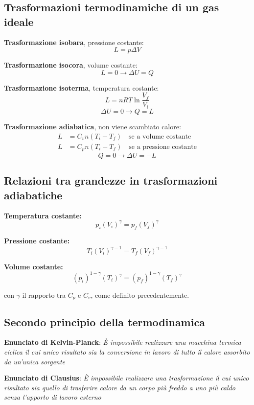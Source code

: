 \documentclass[12pt]{article}
\begin{document}
\subsection{Trasformazioni termodinamiche di un gas ideale}
\textbf{Trasformazione isobara}, pressione costante:
$$ L = p\Delta V $$

\textbf{Trasformazione isocora}, volume costante:
$$ L = 0 \longrightarrow \Delta U = Q $$

\textbf{Trasformazione isoterma}, temperatura costante:
$$ L = nRT\ln{\frac{V_f}{V_i}} $$
$$ \Delta U = 0 \longrightarrow Q = L $$

\textbf{Trasformazione adiabatica}, non viene scambiato calore:
\begin{align*}
    L &= C_vn(T_i - T_f) \hspace{1em} \text{se a volume costante} \\
    L &= C_pn(T_i - T_f) \hspace{1em} \text{se a pressione costante}
\end{align*}
$$ Q = 0 \longrightarrow \Delta U = -L $$

\subsection{Relazioni tra grandezze in trasformazioni adiabatiche}
\textbf{Temperatura costante:}
$$ p_i(V_i)^{\gamma} = p_f(V_f)^{\gamma} $$

\textbf{Pressione costante:}
$$ T_i(V_i)^{\gamma-1} = T_f(V_f)^{\gamma-1} $$

\textbf{Volume costante:}
$$ (p_i)^{1-\gamma}(T_i)^{\gamma} = (p_f)^{1-\gamma}(T_f)^{\gamma} $$

\vspace{1em}

con $\gamma$ il rapporto tra $C_p$ e $C_v$, come definito precedentemente.

\subsection{Secondo principio della termodinamica}
\textbf{Enunciato di Kelvin-Planck}: \textit{È impossibile realizzare una macchina termica ciclica il cui unico risultato sia la conversione in lavoro di tutto il calore assorbito da un'unica sorgente} 

\vspace{1em}

\textbf{Enunciato di Clausius}: \textit{È impossibile realizzare una trasformazione il cui unico risultato sia quello di trasferire calore da un corpo più freddo a uno più caldo senza l'apporto di lavoro esterno}
\end{document}
